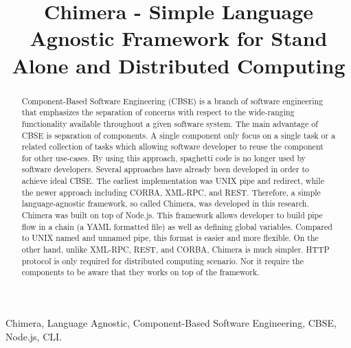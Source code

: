\documentclass[conference]{IEEEtran}
\begin{document}
\title{Chimera - Simple Language Agnostic Framework for Stand Alone and Distributed Computing}

\author{
\and
{}
\and
{}
}

\maketitle


\begin{abstract}
Component-Based Software Engineering (CBSE) is a branch of software 
engineering that emphasizes the separation of concerns with respect to the 
wide-ranging functionality available throughout a given software system.  The 
main advantage of CBSE is separation of components. A single component  
only focus on a single task or a related collection of tasks which allowing software 
developer to reuse the component for other use-cases. By using this approach, 
spaghetti code is no longer used by software developers. Several 
approaches have already been developed in order to achieve ideal CBSE. The earliest 
implementation was UNIX pipe and redirect, while the newer approach including 
CORBA, XML-RPC, and REST. Therefore, a simple language-agnostic framework, 
so called Chimera, was developed in this research. Chimera was built on top of Node.js. 
This framework allows developer to build pipe flow in a chain (a YAML formatted file) 
as well as defining global variables. Compared to UNIX named and unnamed pipe, 
this format is easier and more flexible. On the other hand, unlike XML-RPC, 
REST, and CORBA, Chimera is much simpler. HTTP protocol is only required for
distributed computing scenario. Nor it require the components to be aware that 
they works on top of the framework.
\end{abstract}

\begin{IEEEkeywords}
Chimera, Language Agnostic, Component-Based Software Engineering, CBSE, Node.js, CLI.
\end{IEEEkeywords}
\end{document}
